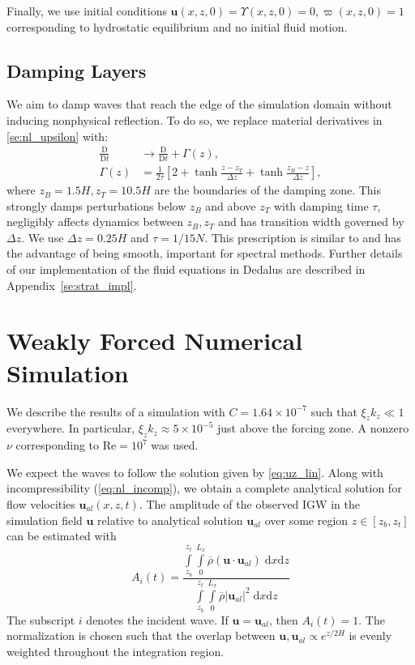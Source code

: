 \documentclass[
        fleqn,
        usenatbib,
        referee,
    ]{mnras}
\newcommand*{\scinot}[2]{#1\times10^{#2}}
\newcommand*{\md}[2]{\frac{\mathrm{D}#1}{\mathrm{D}#2}}
\newcommand*{\abs}[1]{\left|#1\right|}
\newcommand*{\p}[1]{\left(#1\right)}
\newcommand*{\s}[1]{\left[#1\right]}
\newcommand*{\bm}[1]{\mathbf{#1}}
\begin{document}
Finally, we use initial conditions $\bm{u}(x, z, 0) = \Upsilon(x, z, 0) = 0,
\varpi(x, z, 0) = 1$ corresponding to hydrostatic equilibrium and no initial
fluid motion.

\subsection{Damping Layers}\label{ss:damping}

We aim to damp waves that reach the edge of the simulation domain without
inducing nonphysical reflection. To do so, we replace material derivatives
in \autoref{se:nl_upsilon} with:
\begin{align}
    \md{}{t} &\to \md{}{t} + \Gamma(z),\\
    \Gamma(z) &= \frac{1}{2\tau}\s{2 + \tanh \frac{z - z_T}{\Delta z}
        + \tanh \frac{z_B - z}{\Delta z}},\label{eq:Gamma}
\end{align}
where $z_B = 1.5H, z_T = 10.5H$ are the boundaries of the damping zone.
This strongly damps perturbations below $z_B$ and above $z_T$ with damping time
$\tau$, negligibly affects dynamics between $z_B, z_T$ and has transition width
governed by $\Delta z$. We use $\Delta z = 0.25H$ and $\tau = 1/15N$. This
prescription is similar to \citep{lecoanet_damp} and has the advantage of being
smooth, important for spectral methods. Further details of our implementation of
the fluid equations in Dedalus are described in Appendix~\ref{se:strat_impl}.

\section{Weakly Forced Numerical Simulation}\label{s:weak_sim}

We describe the results of a simulation with $C = \scinot{1.64}{-7}$ such that
$\xi_z k_z \ll 1$ everywhere. In particular, $\xi_z k_z \approx \scinot{5}{-5}$
just above the forcing zone. A nonzero $\nu$ corresponding to $\mathrm{Re} =
10^7$ was used.

We expect the waves to follow the solution given by \autoref{eq:uz_lin}. Along
with incompressibility (\autoref{eq:nl_incomp}), we obtain a complete analytical
solution for flow velocities $\bm{u}_{al}(x, z, t)$. The amplitude of the
observed IGW in the simulation field $\bm{u}$ relative to analytical solution
$\bm{u}_{al}$ over some region $z \in [z_b, z_t]$ can be estimated with
\begin{equation}
    A_i(t) = \frac{\int\limits_{z_b}^{z_t}\int\limits_0^{L_x}
        \overline{\rho}\p{\bm{u} \cdot \bm{u}_{al}}\;\mathrm{d}x\mathrm{d}z}
        {\int\limits_{z_b}^{z_t}\int\limits_0^{L_x}
        \overline{\rho}\abs{\bm{u}_{al}}^2\;\mathrm{d}x\mathrm{d}z}
        \label{eq:ahat_def}
\end{equation}
The subscript $i$ denotes the incident wave. If $\bm{u} = \bm{u}_{al}$, then
$A_i(t) = 1$. The normalization is chosen such that the overlap between $\bm{u},
\bm{u}_{al} \propto e^{z/2H}$ is evenly weighted throughout the integration
region.
\end{document}
